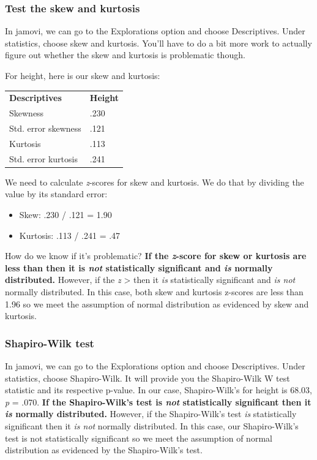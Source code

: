 \documentclass[
]{book}
\begin{document}
\hypertarget{test-the-skew-and-kurtosis}{%
\subsubsection{Test the skew and kurtosis}\label{test-the-skew-and-kurtosis}}

In jamovi, we can go to the Explorations option and choose Descriptives. Under statistics, choose skew and kurtosis. You'll have to do a bit more work to actually figure out whether the skew and kurtosis is problematic though.

For height, here is our skew and kurtosis:

\begin{longtable}[]{@{}ll@{}}
\toprule
& \\
\midrule
\endhead
\textbf{Descriptives} & \textbf{Height} \\
Skewness & .230 \\
Std. error skewness & .121 \\
Kurtosis & .113 \\
Std. error kurtosis & .241 \\
\bottomrule
\end{longtable}

We need to calculate \emph{z}-scores for skew and kurtosis. We do that by dividing the value by its standard error:

\begin{itemize}
\item
  Skew: .230 / .121 = 1.90
\item
  Kurtosis: .113 / .241 = .47
\end{itemize}

How do we know if it's problematic? \textbf{If the \emph{z}-score for skew or kurtosis are less than \textbar{} then it is \emph{not} statistically significant and \emph{is} normally distributed.} However, if the \emph{z} \textgreater{} \textbar{} then it \emph{is} statistically significant and \emph{is not} normally distributed. In this case, both skew and kurtosis z-scores are less than 1.96 so we meet the assumption of normal distribution as evidenced by skew and kurtosis.

\hypertarget{shapiro-wilk-test}{%
\subsubsection{Shapiro-Wilk test}\label{shapiro-wilk-test}}

In jamovi, we can go to the Explorations option and choose Descriptives. Under statistics, choose Shapiro-Wilk. It will provide you the Shapiro-Wilk W test statistic and its respective p-value. In our case, Shapiro-Wilk's for height is 68.03, \emph{p} = .070. \textbf{If the Shapiro-Wilk's test is \emph{not} statistically significant then it \emph{is} normally distributed.} However, if the Shapiro-Wilk's test \emph{is} statistically significant then it \emph{is not} normally distributed. In this case, our Shapiro-Wilk's test is not statistically significant so we meet the assumption of normal distribution as evidenced by the Shapiro-Wilk's test.
\end{document}
